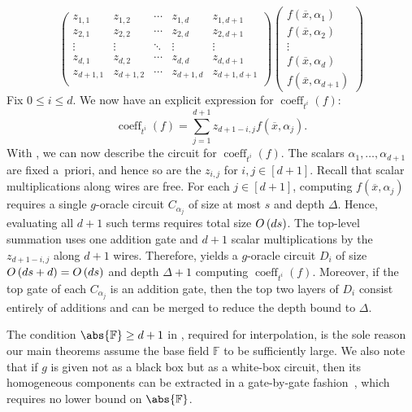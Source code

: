 \documentclass[10pt,a4paper]{amsart}
\newcommand*\apriori{a~priori}
\DeclareMathOperator{\coeff}{coeff}
\newcommand*\F{\mathbb{F}}
\newcommand*\bigO[1]{%
    O\kern-0.0pt\left(#1\right)
}
\begin{document}
\begin{pf}
\[\begin{pmatrix}
            z_{1, 1} & z_{1, 2} & \cdots & z_{1, d} & z_{1, d + 1} \\
            z_{2, 1} & z_{2, 2} & \cdots & z_{2, d} & z_{2, d + 1} \\
            \vdots & \vdots & \ddots & \vdots & \vdots \\
            z_{d, 1} & z_{d, 2} & \cdots & z_{d, d} & z_{d, d + 1} \\
            z_{d + 1, 1} & z_{d + 1, 2} & \cdots & z_{d + 1, d} & z_{d + 1, d + 1} \\
        \end{pmatrix}
        \begin{pmatrix}
            f(\overline{x},\alpha_1) \\
            f(\overline{x},\alpha_2) \\
            \vdots \\
            f(\overline{x},\alpha_d) \\
            f(\overline{x},\alpha_{d+1})
        \end{pmatrix} 
    \]
    Fix $0 \leq i \leq d$.
    We now have an explicit expression for $\coeff_{t^i}(f)$:
    \begin{equation}\label{eq:H_i_explicit}
        \coeff_{t^i}(f) = \sum_{j = 1}^{d + 1} z_{d + 1 - i, j} f(\overline{x},\alpha_j).
    \end{equation}
With , we can now describe the circuit for $\coeff_{t^i}(f)$.
The scalars $\alpha_1, \ldots, \alpha_{d+1}$ are fixed \apriori, and hence so are the $z_{i,j}$ for $i, j \in [d + 1]$.
Recall that scalar multiplications along wires are free.
For each $j \in [d + 1]$, computing $f(\overline{x},\alpha_j)$ requires a single $g$-oracle circuit $C_{\alpha_j}$ of size at most $s$ and depth $\Delta$.
Hence, evaluating all $d+1$ such terms requires total size $\bigO{ds}$.
The top-level summation uses one addition gate and $d+1$ scalar multiplications by the $z_{d + 1 - i, j}$ along $d+1$ wires.
Therefore,  yields a $g$-oracle circuit $D_i$ of size $\bigO{ds+d} = \bigO{ds}$ and depth $\Delta+1$ computing $\coeff_{t^i}(f)$.
Moreover, if the top gate of each $C_{\alpha_j}$ is an addition gate, then the top two layers of $D_i$ consist entirely of additions and can be merged to reduce the depth bound to $\Delta$.
\end{pf}

\begin{remark}
The condition $\abs{\F} \geq d + 1$ in , required for interpolation, is the sole reason our main theorems assume the base field $\F$ to be sufficiently large. 
We also note that if $g$ is given not as a black box but as a white-box circuit, then its homogeneous components can be extracted in a gate-by-gate fashion~\cite{Str73}, which requires no lower bound on $\abs{\F}$.
\end{remark}
\end{document}
